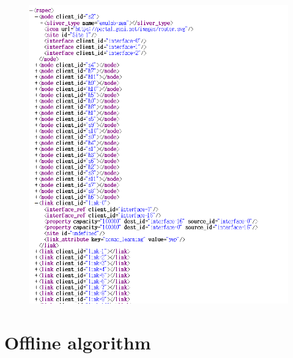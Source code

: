 \documentclass[a4paper,12pt]{report}
\begin{document}
\begin{large}
\begin{figure}
	            \includegraphics[width=1.0\textwidth]{rspec_format.png}
	      	\end{figure}
	   \section{Offline algorithm}

\end{large}
\end{document}
